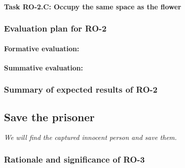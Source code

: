 \vspace{-6pt}
\paragraph*{Task RO-2.C: Occupy the same space as the flower}
\lipsum[1]

\vspace{-10pt}
\subsubsection{Evaluation plan for RO-2}

\vspace{-8pt}
\paragraph*{Formative evaluation:}  
\lipsum[1]


\vspace{-14pt}
\paragraph*{Summative evaluation:}  
\lipsum[1]



\vspace{-10pt}
\subsubsection{Summary of expected results of RO-2}
\vspace{-6pt}

\lipsum[1]






\bigskip
\vspace{-10pt}
\subsection{Save the prisoner}
\label{sec:RO3}
\vspace{-6pt}

\textit{We will find the captured innocent person and save them.}


\vspace{-10pt}
\subsubsection{Rationale and significance of RO-3}
\vspace{-6pt}
\lipsum[2]

